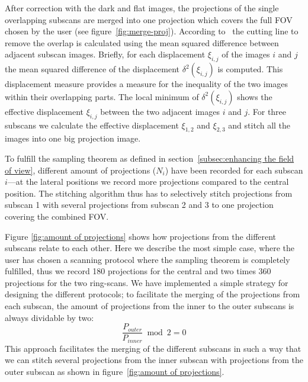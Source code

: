 After correction with the dark and flat images, the projections of the single overlapping subscans are merged into one projection which covers the full FOV chosen by the user (see figure~\ref{fig:merge-proj}). According to~\citet{Hintermueller2009} the cutting line to remove the overlap is calculated using the mean squared difference between adjacent subscan images. Briefly, for each displacement $\xi_{i,j}$ of the images $i$ and $j$ the mean squared difference of the displacement \(\delta^2(\xi_{i,j})\) is computed. This displacement measure provides a measure for the inequality of the two images within their overlapping parts. The local minimum of \(\delta^2(\xi_{i,j})\) shows the effective displacement \(\xi_{i,j}\) between the two adjacent images $i$ and $j$. For three subscans we calculate the effective displacement \(\xi_{1,2}\) and \(\xi_{2,3}\) and stitch all the images into one big projection image.

To fulfill the sampling theorem as defined in section~\ref{subsec:enhancing the field of view}, different amount of projections ($N_{i}$) have been recorded for each subscan $i$---at the lateral positions we record more projections compared to the central position. The stitching algorithm thus has to selectively stitch projections from subscan 1 with several projections from subscan 2 and 3 to one projection covering the combined FOV.

Figure \ref{fig:amount of projections} shows how projections from the different subscans relate to each other. Here we describe the most simple case, where the user has chosen a scanning protocol where the sampling theorem is completely fulfilled, thus we record 180 projections for the central and two times 360 projections for the two ring-scans. We have implemented a simple strategy for designing the different protocols; to facilitate the merging of the projections from each subscan, the amount of projections from the inner to the outer subscans is always dividable by two: 
\begin{equation}
	\frac{P_{outer}}{P_{inner}} \bmod 2 = 0
\label{eq:Modulo}
\end{equation}
This approach facilitates the merging of the different subscans in such a way that we can stitch several projections from the inner subscan with projections from the outer subscan as shown in figure~\ref{fig:amount of projections}.

